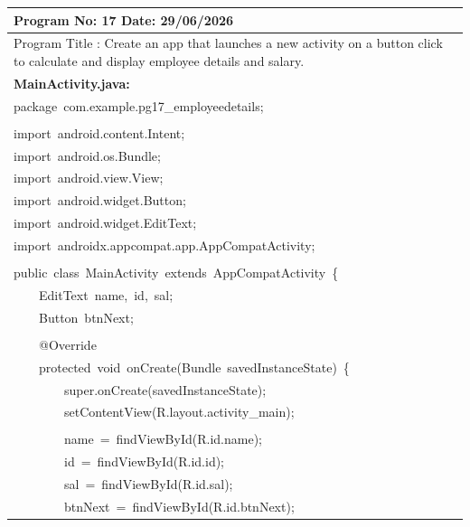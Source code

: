 \documentclass[a4paper,12pt]{article}
\begin{document}
\noindent\begingroup
\renewcommand{\arraystretch}{1.1}
\begin{longtable}{|p{}|}
\hline\endfirsthead\hline\endhead\hline\endfoot\hline\endlastfoot
\rule{0pt}{13pt}Program No: 17 \hfill Date: 29/06/2026 \\
\hline
\rule{0pt}{13pt}Program Title : Create an app that launches a new activity on a button click to calculate and display employee details and salary. \\
\hline
\rule{0pt}{13pt}\textbf{MainActivity.java:} \\
\hline
{\ttfamily\small package\ com.example.pg17\_employeedetails;} \\
\strut \\
{\ttfamily\small import\ android.content.Intent;} \\
{\ttfamily\small import\ android.os.Bundle;} \\
{\ttfamily\small import\ android.view.View;} \\
{\ttfamily\small import\ android.widget.Button;} \\
{\ttfamily\small import\ android.widget.EditText;} \\
{\ttfamily\small import\ androidx.appcompat.app.AppCompatActivity;} \\
\strut \\
{\ttfamily\small public\ class\ MainActivity\ extends\ AppCompatActivity\ \{} \\
{\ttfamily\small \ \ \ \ EditText\ name,\ id,\ sal;} \\
{\ttfamily\small \ \ \ \ Button\ btnNext;} \\
\strut \\
{\ttfamily\small \ \ \ \ @Override} \\
{\ttfamily\small \ \ \ \ protected\ void\ onCreate(Bundle\ savedInstanceState)\ \{} \\
{\ttfamily\small \ \ \ \ \ \ \ \ super.onCreate(savedInstanceState);} \\
{\ttfamily\small \ \ \ \ \ \ \ \ setContentView(R.layout.activity\_main);} \\
\strut \\
{\ttfamily\small \ \ \ \ \ \ \ \ name\ =\ findViewById(R.id.name);} \\
{\ttfamily\small \ \ \ \ \ \ \ \ id\ =\ findViewById(R.id.id);} \\
{\ttfamily\small \ \ \ \ \ \ \ \ sal\ =\ findViewById(R.id.sal);} \\
{\ttfamily\small \ \ \ \ \ \ \ \ btnNext\ =\ findViewById(R.id.btnNext);} \\

\end{longtable}
\end{document}

